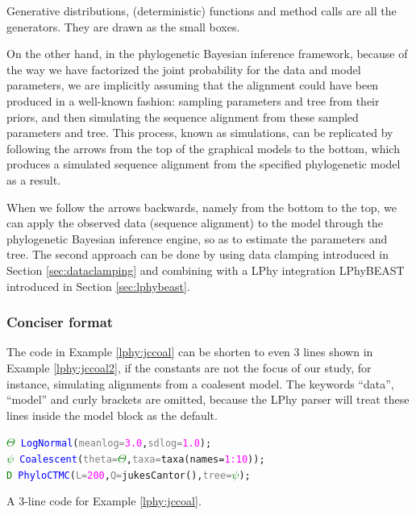 \documentclass[10pt,letterpaper,table]{article}
\begin{document}
Generative distributions, (deterministic) functions and method calls are all the generators. They are drawn as the small boxes.

On the other hand, in the phylogenetic Bayesian inference framework, because of the way we have factorized the joint probability for the data and model parameters, we are implicitly assuming that the alignment could have been produced in a well-known fashion: sampling parameters and tree from their priors, and then simulating the sequence alignment from these sampled parameters and tree. 
This process, known as simulations, can be replicated by following the arrows from the top of the graphical models to the bottom,
which produces a simulated sequence alignment from the specified phylogenetic model as a result.

When we follow the arrows backwards, namely from the bottom to the top, we can apply the observed data (sequence alignment) to the model through the phylogenetic Bayesian inference engine, so as to estimate the parameters and tree\cite{hohna2014probabilistic}. 
The second approach can be done by using data clamping introduced in Section \ref{sec:dataclamping} and combining with a LPhy integration LPhyBEAST introduced in Section \ref{sec:lphybeast}.

\subsubsection{Conciser format}
The code in Example \ref{lphy:jccoal} can be shorten to even 3 lines shown in Example \ref{lphy:jccoal2}, if the constants are not the focus of our study, for instance, simulating alignments from a coalesent model.
The keywords ``data'', ``model'' and curly brackets are omitted, because the LPhy parser will treat these lines inside the model block as the default.

{
  \small
  \begin{listing}
    \begin{alltt}
    \textcolor{green}{\(\Theta\)} ~ \textcolor{blue}{LogNormal}(\textcolor{gray}{meanlog=}\textcolor{magenta}{3.0}, \textcolor{gray}{sdlog=}\textcolor{magenta}{1.0});
    \textcolor{green}{\(\psi\)} ~ \textcolor{blue}{Coalescent}(\textcolor{gray}{theta=}\textcolor{green}{\(\Theta\)}, \textcolor{gray}{taxa=}\textcolor{magenta!80!black}{taxa}(names=\textcolor{magenta}{1:10}));
    \textcolor{green}{D} ~ \textcolor{blue}{PhyloCTMC}(\textcolor{gray}{L=}\textcolor{magenta}{200}, \textcolor{gray}{Q=}\textcolor{magenta!80!black}{jukesCantor}(), \textcolor{gray}{tree=}\textcolor{green}{\(\psi\)});
    \end{alltt}
    \caption{A 3-line code for Example \ref{lphy:jccoal}.}
    \label{lphy:jccoal2}
  \end{listing}
}
\end{document}
